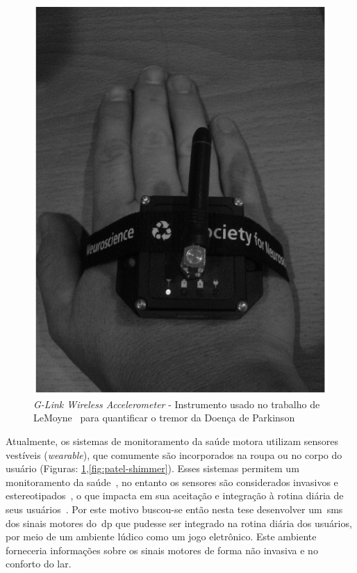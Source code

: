 \begin{figure}
 \centering
 \includegraphics[scale=0.3]{./img/quantif-parkinson.png}
\caption[\textit{G-Link Wireless Accelerometer} - Instrumento usado no trabalho de LeMoyne para quantificar o tremor da Doença de Parkinson]{\textit{G-Link Wireless Accelerometer} - Instrumento usado no trabalho de LeMoyne~\cite{LeMoyne2009} para quantificar o tremor da Doença de Parkinson} 
 \label{fig:quantif-parkinson}
\end{figure}


Atualmente, os sistemas de monitoramento da saúde motora utilizam sensores vestíveis (\textit{wearable}), que comumente são incorporados na roupa ou no corpo do usuário (Figuras: \ref{fig:quantif-parkinson},\ref{fig:patel-shimmer}). Esses sistemas permitem um monitoramento da saúde~\cite{patel_monitoring_2009,lemoyne2010}, no entanto os sensores são considerados invasivos e estereotipados~\cite{aarhus_negotiating_2010}, o que impacta em sua aceitação e integração à rotina diária de seus usuários~\cite{alemdar2015}. Por este motivo buscou-se então nesta tese desenvolver um~\ac{sms} dos sinais motores do~\ac{dp} que pudesse ser integrado na rotina diária dos usuários, por meio de um ambiente lúdico como um jogo eletrônico. Este ambiente forneceria informações sobre os sinais motores de forma não invasiva e no conforto do lar. 


